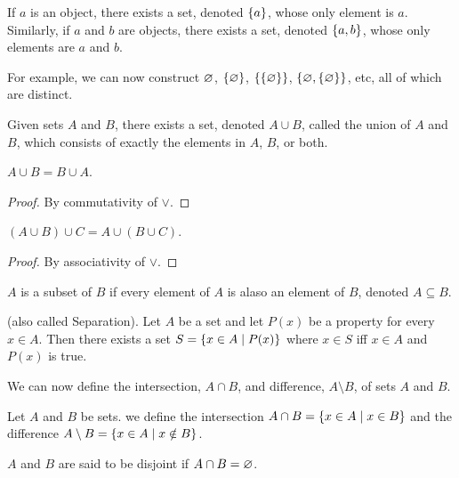 \begin{axiom}[Pairing] \label{def:zfc:pairing}
    If $a$ is an object, there exists a set, denoted $\set{a}$, whose only
    element is $a$.
    Similarly, if $a$ and $b$ are objects, there exists a set, denoted
    $\set{a, b}$, whose only elements are $a$ and $b$.
\end{axiom}
For example, we can now construct $\varnothing$, $\set{\O}$, $\set{\set{\O}}$,
$\set{\O, \set{\O}}$, etc, all of which are distinct.

\begin{axiom} \label{def:zfc:pairwise_union}
    Given sets $A$ and $B$, there exists a set, denoted $A \cup B$, called the
    union of $A$ and $B$, which consists of exactly the elements in $A$, $B$, or
    both.
\end{axiom}

\begin{problem}
    $A \cup B = B \cup A$.
\end{problem}
\begin{proof}
    By commutativity of $\lor$.
\end{proof}
\begin{problem}
    $(A \cup B) \cup C = A \cup (B \cup C)$.
\end{problem}
\begin{proof}
    By associativity of $\lor$.
\end{proof}

\begin{definition}[Subset] \label{def:zfc:subset}
    $A$ is a subset of $B$ if every element of $A$ is alaso an element of $B$,
    denoted $A \subseteq B$.
\end{definition}

\begin{axiom}[Specification] \label{def:zfc:specification}
    (also called Separation).
    Let $A$ be a set and let $P(x)$ be a property for every $x \in A$.
    Then there exists a set $S = \set{x \in A \mid P(x)}$ where $x \in S$ iff
    $x \in A$ and $P(x)$ is true.
\end{axiom}
We can now define the intersection, $A \cap B$, and difference, $A \setminus B$,
of sets $A$ and $B$.
\begin{definition}
    Let $A$ and $B$ be sets.
    we define the intersection $A \cap B = \set{x \in A \mid x \in B}$ and the
    difference $A \setminus B = \set{x \in A \mid x \notin B}$.

    $A$ and $B$ are said to be disjoint if $A \cap B = \varnothing$.
\end{definition}

